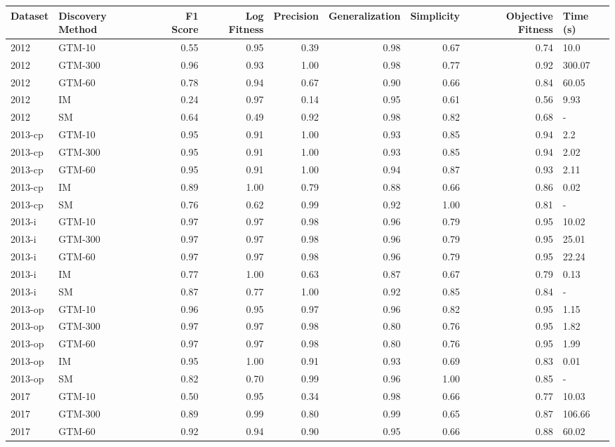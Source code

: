 \begin{tabular}{llrrrrrrl}
\toprule
Dataset & Discovery Method & F1 Score & Log Fitness & Precision & Generalization & Simplicity & Objective Fitness & Time (s) \\
\midrule
2012 & GTM-10 & 0.55 & 0.95 & 0.39 & 0.98 & 0.67 & 0.74 & 10.0 \\
2012 & GTM-300 & 0.96 & 0.93 & 1.00 & 0.98 & 0.77 & 0.92 & 300.07 \\
2012 & GTM-60 & 0.78 & 0.94 & 0.67 & 0.90 & 0.66 & 0.84 & 60.05 \\
2012 & IM & 0.24 & 0.97 & 0.14 & 0.95 & 0.61 & 0.56 & 9.93 \\
2012 & SM & 0.64 & 0.49 & 0.92 & 0.98 & 0.82 & 0.68 & - \\
2013-cp & GTM-10 & 0.95 & 0.91 & 1.00 & 0.93 & 0.85 & 0.94 & 2.2 \\
2013-cp & GTM-300 & 0.95 & 0.91 & 1.00 & 0.93 & 0.85 & 0.94 & 2.02 \\
2013-cp & GTM-60 & 0.95 & 0.91 & 1.00 & 0.94 & 0.87 & 0.93 & 2.11 \\
2013-cp & IM & 0.89 & 1.00 & 0.79 & 0.88 & 0.66 & 0.86 & 0.02 \\
2013-cp & SM & 0.76 & 0.62 & 0.99 & 0.92 & 1.00 & 0.81 & - \\
2013-i & GTM-10 & 0.97 & 0.97 & 0.98 & 0.96 & 0.79 & 0.95 & 10.02 \\
2013-i & GTM-300 & 0.97 & 0.97 & 0.98 & 0.96 & 0.79 & 0.95 & 25.01 \\
2013-i & GTM-60 & 0.97 & 0.97 & 0.98 & 0.96 & 0.79 & 0.95 & 22.24 \\
2013-i & IM & 0.77 & 1.00 & 0.63 & 0.87 & 0.67 & 0.79 & 0.13 \\
2013-i & SM & 0.87 & 0.77 & 1.00 & 0.92 & 0.85 & 0.84 & - \\
2013-op & GTM-10 & 0.96 & 0.95 & 0.97 & 0.96 & 0.82 & 0.95 & 1.15 \\
2013-op & GTM-300 & 0.97 & 0.97 & 0.98 & 0.80 & 0.76 & 0.95 & 1.82 \\
2013-op & GTM-60 & 0.97 & 0.97 & 0.98 & 0.80 & 0.76 & 0.95 & 1.99 \\
2013-op & IM & 0.95 & 1.00 & 0.91 & 0.93 & 0.69 & 0.83 & 0.01 \\
2013-op & SM & 0.82 & 0.70 & 0.99 & 0.96 & 1.00 & 0.85 & - \\
2017 & GTM-10 & 0.50 & 0.95 & 0.34 & 0.98 & 0.66 & 0.77 & 10.03 \\
2017 & GTM-300 & 0.89 & 0.99 & 0.80 & 0.99 & 0.65 & 0.87 & 106.66 \\
2017 & GTM-60 & 0.92 & 0.94 & 0.90 & 0.95 & 0.66 & 0.88 & 60.02 \\

\end{tabular}
